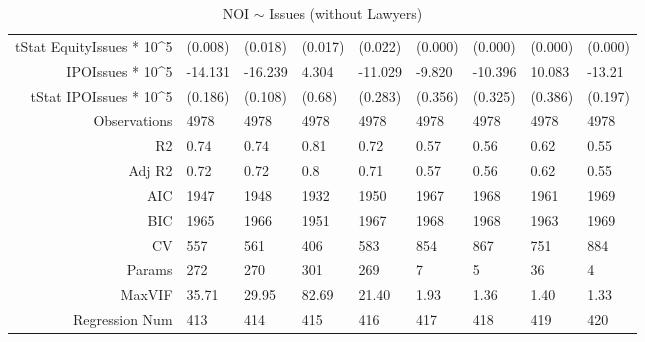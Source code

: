 \begin{table}[ht]
\begin{tabular}{rllllllll}
  tStat EquityIssues * 10^5 & (0.008) & (0.018) & (0.017) & (0.022) & (0.000) & (0.000) & (0.000) & (0.000) \\ 
  IPOIssues * 10^5 & -14.131 & -16.239 & 4.304 & -11.029 & -9.820 & -10.396 & 10.083 & -13.21 \\ 
  tStat IPOIssues * 10^5 & (0.186) & (0.108) & (0.68) & (0.283) & (0.356) & (0.325) & (0.386) & (0.197) \\ 
  Observations & 4978 & 4978 & 4978 & 4978 & 4978 & 4978 & 4978 & 4978 \\ 
  R2 & 0.74 & 0.74 & 0.81 & 0.72 & 0.57 & 0.56 & 0.62 & 0.55 \\ 
  Adj R2 & 0.72 & 0.72 & 0.8 & 0.71 & 0.57 & 0.56 & 0.62 & 0.55 \\ 
  AIC & 1947 & 1948 & 1932 & 1950 & 1967 & 1968 & 1961 & 1969 \\ 
  BIC & 1965 & 1966 & 1951 & 1967 & 1968 & 1968 & 1963 & 1969 \\ 
  CV & 557 & 561 & 406 & 583 & 854 & 867 & 751 & 884 \\ 
  Params & 272 & 270 & 301 & 269 & 7 & 5 & 36 & 4 \\ 
  MaxVIF & 35.71 & 29.95 & 82.69 & 21.40 & 1.93 & 1.36 & 1.40 & 1.33 \\ 
  Regression Num & 413 & 414 & 415 & 416 & 417 & 418 & 419 & 420 \\ 
   \hline
\end{tabular}
\caption{NOI $\sim$ Issues (without Lawyers)} 
\end{table}
